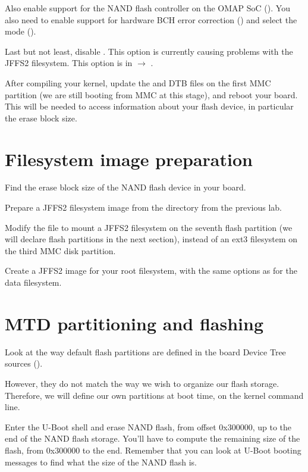 Also enable support for the NAND flash controller on the OMAP SoC
(). You also need to enable support for
hardware BCH error correction () and select
the  mode
().

Last but not least, disable . This option is
currently causing problems with the JFFS2 filesystem. This option is
in  $\rightarrow$
.

After compiling your kernel, update the  and
DTB files on the first MMC partition (we are still booting from
MMC at this stage), and reboot your board. This will be
needed to access information about your flash device, in particular
the erase block size.  

\section{Filesystem image preparation}

Find the erase block size of the NAND flash device in your board.

Prepare a JFFS2 filesystem image from the 
directory from the previous lab.

Modify the  file to mount a JFFS2 filesystem on
the seventh flash partition (we will declare flash partitions in the
next section), instead of an ext3 filesystem on the
third MMC disk partition.

Create a JFFS2 image for your root filesystem, with the same options
as for the data filesystem.

\section{MTD partitioning and flashing}

Look at the way default flash partitions are defined in the board
Device Tree sources ().

However, they do not match the way we wish to organize our flash
storage. Therefore, we will define our own partitions at boot time,
on the kernel command line.

Enter the U-Boot shell and erase NAND flash, from offset 0x300000,
up to the end of the NAND flash storage. You'll have to compute the
remaining size of the flash, from 0x300000 to the end. Remember that
you can look at U-Boot booting messages to find what the size of
the NAND flash is.

